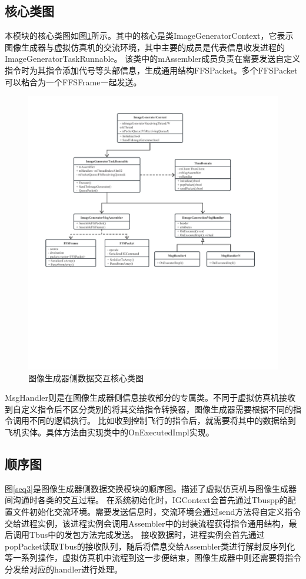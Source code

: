 \subsection{核心类图}
本模块的核心类图如图\ref{module32}所示。其中的核心是类ImageGeneratorContext，它表示图像生成器与虚拟仿真机的交流环境，其中主要的成员是代表信息收发进程的ImageGeneratorTaskRunnable。
该类中的mAssembler成员负责在需要发送自定义指令时为其指令添加代号等头部信息，生成通用结构FFSPacket。多个FFSPacket可以粘合为一个FFSFrame一起发送。
\begin{figure}[h!]
    \begin{center}
        \includegraphics[width=\textwidth]{pictures/classdiagram3.pdf}
        \caption{图像生成器侧数据交互核心类图}
        \label{module32}
    \end{center}
\end{figure}
\par
MsgHandler则是在图像生成器侧信息接收部分的专属类。不同于虚拟仿真机接收到自定义指令后不区分类别的将其交给指令转换器，图像生成器需要根据不同的指令调用不同的逻辑执行。
比如收到控制飞行的指令后，就需要将其中的数据给到飞机实体。具体方法由实现类中的OnExecutedImpl实现。

\subsection{顺序图}
图\ref{seq3}是图像生成器侧数据交换模块的顺序图。描述了虚拟仿真机与图像生成器间沟通时各类的交互过程。
在系统初始化时，IGContext会首先通过Tbuspp的配置文件初始化交流环境。需要发送信息时，交流环境会通过send方法将自定义指令交给进程实例，该进程实例会调用Assembler中的封装流程获得指令通用结构，最后调用Tbus中的发包方法完成发送。
接收数据时，进程实例会首先通过popPacket读取Tbus的接收队列，随后将信息交给Assembler类进行解封反序列化等一系列操作，虚拟仿真机中流程到这一步便结束，图像生成器中则还需要将指令分发给对应的handler进行处理。

